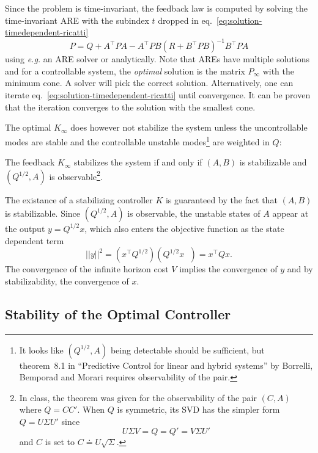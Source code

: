 Since the problem is time-invariant, the feedback law is computed by solving the time-invariant ARE with the subindex $t$ dropped in eq.~\eqref{eq:solution-timedependent-ricatti}
\begin{equation*}
  P = Q + A^\top P A - A^\top P B\left(R + B^\top PB\right)^{-1}B^\top P A
\end{equation*}
using \textit{e.g.} an ARE solver or analytically. Note that AREs have multiple solutions and for a controllable system, the \emph{optimal} solution is the matrix $P_\infty$ with the minimum cone. A solver will pick the correct solution. Alternatively, one can iterate eq.~\eqref{eq:solution-timedependent-ricatti} until convergence. It can be proven that the iteration converges to the solution with the smallest cone.

The optimal $K_\infty$ does however not stabilize the system unless the uncontrollable modes are stable and the controllable unstable modes\footnote{It looks like $(Q^{1/2},A)$ being detectable should be sufficient, but theorem~8.1 in ``Predictive Control for linear and hybrid systems'' by Borrelli, Bemporad and Morari requires observability of the pair.} are weighted in $Q$:
\begin{theorem}
  The feedback $K_\infty$ stabilizes the system if and only if $(A,B)$ is stabilizable and $(Q^{1/2},A)$ is observable\footnote{In class, the theorem was given for the observability of the pair $(C,A)$ where $Q=CC'$. When $Q$ is symmetric, its SVD has the simpler form $Q = U\Sigma U'$ since
    \begin{equation*}
      U\Sigma V = Q = Q' = V\Sigma U'
    \end{equation*}
    and $C$ is set to $C \doteq U\sqrt{\Sigma}$.}.
\end{theorem}
The existance of a stabilizing controller $K$ is guaranteed by the fact that $(A,B)$ is stabilizable. Since $(Q^{1/2},A)$ is observable, the unstable states of $A$ appear at the output $y=Q^{1/2}x$, which also enters the objective function as the state dependent term
\begin{equation*}
  ||y||^2 = \left(x^\top Q^{1/2}\right)\left(Q^{1/2} x^{\phantom{\top}}\right) = x^\top Qx.
\end{equation*}
The convergence of the infinite horizon cost $V$ implies the convergence of $y$ and by stabilizability, the convergence of $x$.


\subsection{Stability of the Optimal Controller}
\label{sec:stability-optimal-controller}

